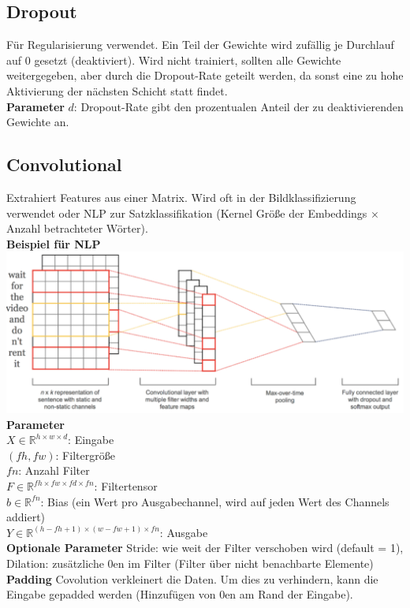 \documentclass[12pt]{article}
\newcommand{\R}{\mathbb{R}}
\begin{document}
	\subsection{Dropout}
	Für Regularisierung verwendet. Ein Teil der Gewichte wird zufällig je Durchlauf auf 0 gesetzt (deaktiviert). Wird nicht trainiert, sollten alle Gewichte weitergegeben, aber durch die Dropout-Rate geteilt werden, da sonst eine zu hohe Aktivierung der nächsten Schicht statt findet.\\
	\textbf{Parameter} $d$: Dropout-Rate gibt den prozentualen Anteil der zu deaktivierenden Gewichte an.
	\subsection{Convolutional}
	Extrahiert Features aus einer Matrix. Wird oft in der Bildklassifizierung verwendet oder NLP zur Satzklassifikation (Kernel Größe der Embeddings $\times$ Anzahl betrachteter Wörter).\\
	\textbf{Beispiel für NLP}\\
	\includegraphics[width=\linewidth]{figures/convolution-nlp.png}\\
	\textbf{Parameter}\\
	$X \in \R^{h \times w \times d}$: Eingabe\\
	$(fh, fw)$: Filtergröße\\
	$fn$: Anzahl Filter\\
	$F \in \R^{fh \times fw \times fd \times fn}$: Filtertensor\\
	$b \in \R^{fn}$: Bias (ein Wert pro Ausgabechannel, wird auf jeden Wert des Channels addiert)\\
	$Y \in \R^{(h-fh+1) \times (w-fw+1) \times fn}$: Ausgabe\\
	\textbf{Optionale Parameter} Stride: wie weit der Filter verschoben wird (default = 1), Dilation: zusätzliche 0en im Filter (Filter über nicht benachbarte Elemente)\\
	\textbf{Padding} Covolution verkleinert die Daten. Um dies zu verhindern, kann die Eingabe gepadded werden (Hinzufügen von 0en am Rand der Eingabe).\\
\end{document}
